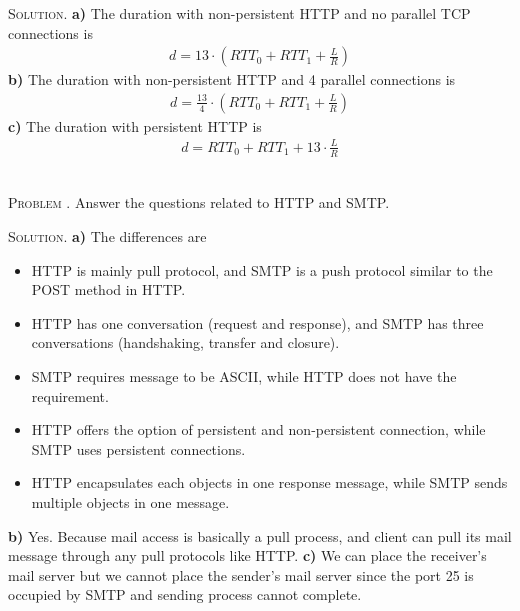 \documentclass[12pt, a4paper, oneside]{article}
\newcounter{problemname}
\newenvironment{problem}{\stepcounter{problemname}\par\noindent\textsc{Problem \arabic{problemname}. }}{\\\par}
\newenvironment{solution}{\par\noindent\textsc{Solution. }}{\\\par}
\begin{document}
\begin{solution}
    \textbf{a)} The duration with non-persistent HTTP and no parallel TCP connections is
    \begin{align*}
        d = 13\cdot(RTT_0 + RTT_1 + \frac{L}{R})
    \end{align*}
    \textbf{b)} The duration with non-persistent HTTP and 4 parallel connections is 
    \begin{align*}
        d = \frac{13}{4}\cdot(RTT_0 + RTT_1 + \frac{L}{R})
    \end{align*}
    \textbf{c)} The duration with persistent HTTP is
    \begin{align*}
        d = RTT_0 + RTT_1 + 13\cdot\frac{L}{R}
    \end{align*}
\end{solution}

\begin{problem}
    Answer the questions related to HTTP and SMTP.
\end{problem}

\begin{solution}
    \textbf{a)} The differences are\newline
    \begin{minipage}[t]{1.0\textwidth}
        \begin{itemize}
            \item HTTP is mainly pull protocol, and SMTP is a push protocol similar to the POST method in HTTP.
            \item HTTP has one conversation (request and response), and SMTP has three conversations (handshaking, transfer and closure).
            \item SMTP requires message to be ASCII, while HTTP does not have the requirement.
            \item HTTP offers the option of persistent and non-persistent connection, while SMTP uses persistent connections.
            \item HTTP encapsulates each objects in one response message, while SMTP sends multiple objects in one message.
        \end{itemize}
    \end{minipage}
    \newline\newline\textbf{b)} Yes. Because mail access is basically a pull process, and client can pull its mail message through any pull protocols like HTTP.
    \newline\textbf{c)} We can place the receiver's mail server but we cannot place the sender's mail server since the port 25 is occupied by SMTP and sending process cannot complete.
\end{solution}
\end{document}
